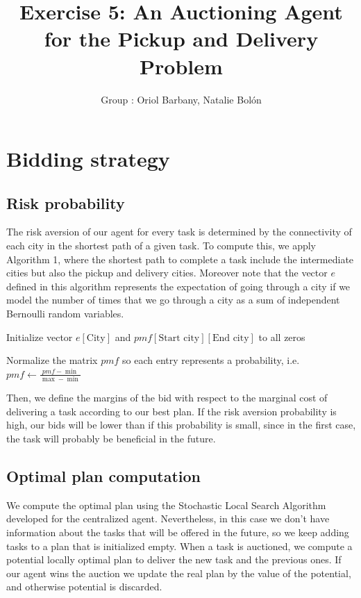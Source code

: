 \documentclass[11pt]{article}
\title{\bf Exercise 5: An Auctioning Agent for the Pickup and Delivery Problem}
\author{Group \textnumero 54: Oriol Barbany, Natalie Bolón}
\begin{document}
\maketitle

\section{Bidding strategy}
\subsection{Risk probability}
The risk aversion of our agent for every task is determined by the connectivity of each city in the shortest path of a given task. To compute this, we apply Algorithm 1, where the shortest path to complete a task include the intermediate cities but also the pickup and delivery cities. Moreover note that the vector $e$ defined in this algorithm represents the expectation of going through a city if we model the number of times that we go through a city as a sum of independent Bernoulli random variables.

\begin{algorithm}[H]
\SetAlgoLined
{}
Initialize vector $e[\text{City}]$ and $pmf[\text{Start city}][\text{End city}]$ to all zeros

Normalize the matrix $pmf$ so each entry represents a probability, i.e. $pmf \leftarrow \frac{pmf-\min}{\max - \min}$
 \caption{}
\end{algorithm}

Then, we define the margins of the bid with respect to the marginal cost of delivering a task according to our best plan. If the risk aversion probability is high, our bids will be lower than if this probability is small, since in the first case, the task will probably be beneficial in the future.

\subsection{Optimal plan computation}
We compute the optimal plan using the Stochastic Local Search Algorithm developed for the centralized agent. Nevertheless, in this case we don't have information about the tasks that will be offered in the future, so we keep adding tasks to a plan that is initialized empty. When a task is auctioned, we compute a potential locally optimal plan to deliver the new task and the previous ones. If our agent wins the auction we update the real plan by the value of the potential, and otherwise potential is discarded.
\end{document}
